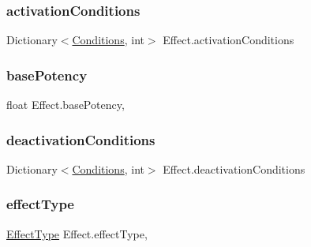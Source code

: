 \subsubsection{\texorpdfstring{activationConditions}{activationConditions}}
{\footnotesize\ttfamily Dictionary$<$\mbox{\hyperlink{class_effect_ab13a718053e330a11f9f66a9b16f4686}{Conditions}}, int$>$ Effect.\+activation\+Conditions\hspace{0.3cm}{\ttfamily [get]}}

\mbox{\label{class_effect_a8a406c60ab681a1b0a68365042b32a44}} 
\subsubsection{\texorpdfstring{basePotency}{basePotency}}
{\footnotesize\ttfamily float Effect.\+base\+Potency\hspace{0.3cm}{\ttfamily [get]}, {\ttfamily [set]}}

\mbox{\label{class_effect_a364788c565859970111c834c3da7f15d}} 
\subsubsection{\texorpdfstring{deactivationConditions}{deactivationConditions}}
{\footnotesize\ttfamily Dictionary$<$\mbox{\hyperlink{class_effect_ab13a718053e330a11f9f66a9b16f4686}{Conditions}}, int$>$ Effect.\+deactivation\+Conditions\hspace{0.3cm}{\ttfamily [get]}}

\mbox{\label{class_effect_a5cf8eca9899b1ce70a9cdad8ab6f5f1e}} 
\subsubsection{\texorpdfstring{effectType}{effectType}}
{\footnotesize\ttfamily \mbox{\hyperlink{class_effect_a28d85888db94ec53ee9cb75e9706f6e4}{Effect\+Type}} Effect.\+effect\+Type\hspace{0.3cm}{\ttfamily [get]}, {\ttfamily [set]}}

